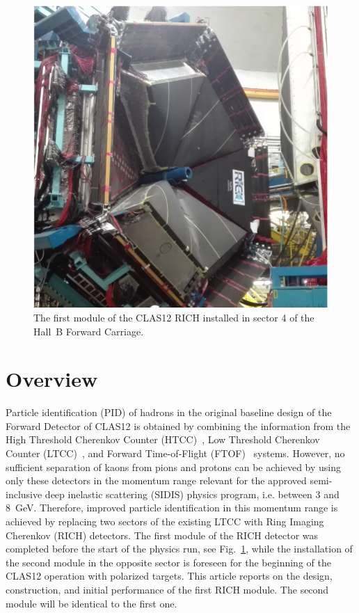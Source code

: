 \documentclass[5p,times,twocolumn]{elsarticle}
\begin{document}
\begin{figure}[th]
\begin{center}
\includegraphics[width=0.80\columnwidth]{RICH_Installed.pdf}
\end{center}
\caption{The first module of the CLAS12 RICH installed in sector 4 of the Hall~B Forward Carriage.}
\label{Fig:RICHPic}
\end{figure}

\section{Overview}

Particle identification (PID) of hadrons in the original baseline design of the Forward Detector of CLAS12 is obtained
by combining the information from the High Threshold Cherenkov Counter (HTCC)~\cite{REF:htcc-nim}, Low Threshold
Cherenkov Counter (LTCC)~\cite{REF:ltcc-nim}, and Forward Time-of-Flight (FTOF)~\cite{REF:ftof-nim} systems. However,
no sufficient separation of kaons from pions and protons can be achieved by using only these detectors in the
momentum range relevant for the approved semi-inclusive deep inelastic scattering (SIDIS) physics program,
i.e. between 3 and 8~GeV. Therefore, improved particle identification in this momentum range is achieved by
replacing two sectors of the existing LTCC with Ring Imaging Cherenkov (RICH) detectors. The first module of the
RICH detector was completed before the start of the physics run, see Fig.~\ref{Fig:RICHPic}, while the installation
of the second module in the opposite sector is foreseen for the beginning of the CLAS12 operation with polarized
targets. This article reports on the design, construction, and initial performance of the first RICH module. The second
module will be identical to the first one.
\end{document}
